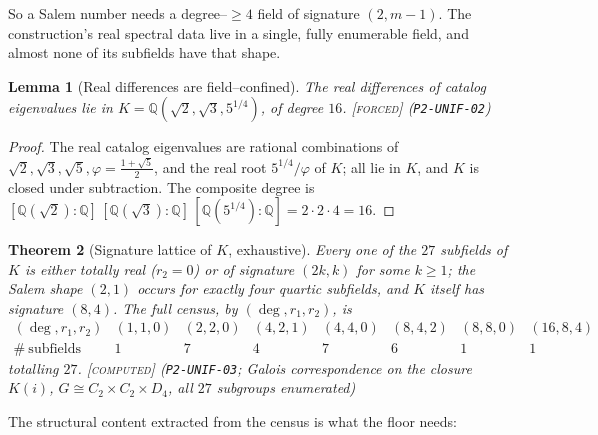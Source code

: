 \documentclass[11pt]{article}
\theoremstyle{plain}
\newtheorem{theorem}{Theorem}[section]
\newtheorem{lemma}[theorem]{Lemma}
\theoremstyle{definition}
\theoremstyle{remark}
\newcommand{\forced}{\textcolor{forcedc}{\textsc{[forced]}}}
\newcommand{\computed}{\textcolor{forcedc}{\textsc{[computed]}}}
\newcommand{\Q}{\mathbb{Q}}
\begin{document}
So a Salem number needs a degree--$\ge4$ field of signature $(2,m-1)$. The construction's real spectral data live in a single, fully enumerable field, and almost none of its subfields have that shape.

\begin{lemma}[Real differences are field--confined]\label{lem:diffconf}
The real differences of catalog eigenvalues lie in $K=\Q(\sqrt2,\sqrt3,5^{1/4})$, of degree $16$. \forced{} {\small(\texttt{P2-UNIF-02})}
\end{lemma}
\begin{proof}
The real catalog eigenvalues are rational combinations of $\sqrt2,\sqrt3,\sqrt5,\varphi=\tfrac{1+\sqrt5}2$, and the real root $5^{1/4}/\varphi$ of $K$; all lie in $K$, and $K$ is closed under subtraction. The composite degree is $[\Q(\sqrt2):\Q]\,[\Q(\sqrt3):\Q]\,[\Q(5^{1/4}):\Q]=2\cdot2\cdot4=16$.
\end{proof}

\begin{theorem}[Signature lattice of $K$, exhaustive]\label{thm:siglattice}
Every one of the $27$ subfields of $K$ is either totally real ($r_2=0$) or of signature $(2k,k)$ for some $k\ge1$; the Salem shape $(2,1)$ occurs for exactly four quartic subfields, and $K$ itself has signature $(8,4)$. The full census, by $(\deg,r_1,r_2)$, is
\[
\begin{array}{c|ccccccc}
(\deg,r_1,r_2) & (1,1,0) & (2,2,0) & (4,2,1) & (4,4,0) & (8,4,2) & (8,8,0) & (16,8,4)\\\hline
\#\ \text{subfields} & 1 & 7 & 4 & 7 & 6 & 1 & 1
\end{array}
\]
totalling $27$. \computed{} {\small(\texttt{P2-UNIF-03}; Galois correspondence on the closure $K(i)$, $G\cong C_2\times C_2\times D_4$, all $27$ subgroups enumerated)}
\end{theorem}

The structural content extracted from the census is what the floor needs:
\end{document}
